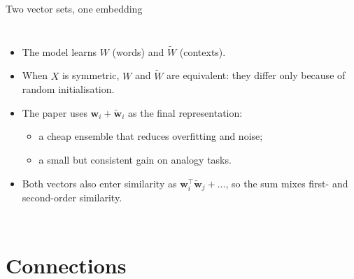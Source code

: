\documentclass[aspectratio=169,11pt]{beamer}
\newcommand{\wv}{\mathbf{w}}
\newcommand{\cv}{\tilde{\mathbf{w}}}
\begin{document}
\begin{frame}{Two vector sets, one embedding}
\small
\begin{columns}[c]
\begin{itemize}\setlength\itemsep{1pt}
  \item The model learns $W$ (words) and $\tilde W$ (contexts).
  \item When $X$ is symmetric, $W$ and $\tilde W$ are \alert{equivalent}: they differ only because of random initialisation.
  \item The paper uses $\wv_i+\cv_i$ as the final representation:
    \begin{itemize}\small
      \item a cheap ensemble that reduces overfitting and noise;
      \item a small but consistent gain on analogy tasks.
    \end{itemize}
  \item Both vectors also enter similarity as $\wv_i^\top\cv_j+\ldots$, so the sum mixes first- and second-order similarity.
\end{itemize}
\centering
{}
\end{columns}
\end{frame}

\section{Connections}
\end{document}
